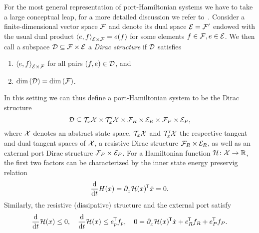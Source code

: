 \begin{remark}
    For the most general representation of port-Hamiltonian systems we have to take a large conceptual leap, for a more detailed discussion we refer to~\cite[Section~2.2]{VanDerSchaft2014}.
    Consider a finite-dimensional vector space $\mathcal{F}$ and denote its dual space $\mathcal{E} = \mathcal{F}'$ endowed with the usual dual product ${\langle e, f \rangle}_{\mathcal{E} \times \mathcal{F}} = e(f)$ for some elements $f \in \mathcal{F}, e \in \mathcal{E}$.
    We then call a subspace $\mathcal{D} \subseteq \mathcal{F} \times \mathcal{E}$ a \emph{Dirac structure} if $\mathcal{D}$ satisfies
    \begin{enumerate}
        \item ${\langle e, f \rangle}_{\mathcal{E} \times \mathcal{F}}$ for all pairs $(f, e) \in \mathcal{D}$, and
        \item $\dim{(\mathcal{D})} = \dim{(\mathcal{F})}$.
    \end{enumerate}
    In this setting we can thus define a port-Hamiltonian system to be the Dirac structure
    \begin{equation*}
        \mathcal{D} \subseteq \mathcal{T}_x \mathcal{X} \times \mathcal{T}'_x \mathcal{X} \times \mathcal{F}_R \times \mathcal{E}_R \times \mathcal{F}_P \times \mathcal{E}_P,
    \end{equation*}
    where $\mathcal{X}$ denotes an abstract state space, $\mathcal{T}_x \mathcal{X}$ and $\mathcal{T}'_x \mathcal{X}$ the respective tangent and dual tangent spaces of $\mathcal{X}$, a resistive Dirac structure $\mathcal{F}_R \times \mathcal{E}_R$, as well as an external port Dirac structure $\mathcal{F}_P \times \mathcal{E}_P$.
    For a Hamiltonian function $\mathcal{H} \colon \mathcal{X} \to \mathbb{R}$, the first two factors can be characterized by the inner state energy preservig relation
    \begin{equation*}
        \frac{\mathop{}\!\mathrm{d}}{\mathop{}\!\mathrm{d} t} H(x) = \partial_{x}^{} \mathcal{H}(x)^{\mkern-1.5mu \mathsf{T}} \dot{x} = 0.
    \end{equation*}
    Similarly, the resistive (dissipative) structure and the external port satisfy
    \begin{equation*}
        \frac{\mathop{}\!\mathrm{d}}{\mathop{}\!\mathrm{d} t} \mathcal{H}(x) \leq 0,\quad \frac{\mathop{}\!\mathrm{d}}{\mathop{}\!\mathrm{d} t} \mathcal{H}(x) \leq e_p^{\mkern-1.5mu \mathsf{T}} f_p,\quad 0 = \partial_{x}^{} \mathcal{H}(x)^{\mkern-1.5mu \mathsf{T}} \dot{x} + e_R^{\mkern-1.5mu \mathsf{T}} f_R + e_P^{\mkern-1.5mu \mathsf{T}} f_P.
    \end{equation*}
\end{remark}
